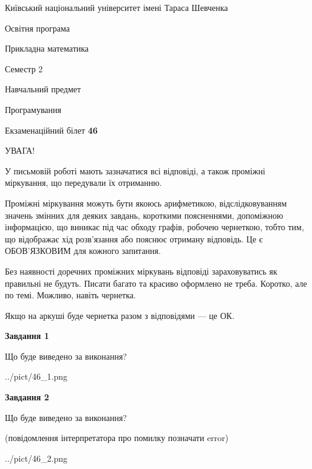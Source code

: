 \documentclass[12pt, ukrainian]{article}
\begin{document}
{{\begin {small}\par
{ \center  Київський національний університет імені Тараса Шевченка \par}
{\parbox {5 cm}{Освітня програма \hfill}{\parbox {7 cm}{Прикладна математика\hfill}}\parbox {6 cm}{\hfill Семестр 2}}\par
{\parbox {5 cm} {Навчальний предмет \hfill}\parbox {7 cm}{Програмування \hfill}\parbox {6cm}{\hfill}\par}\vspace{-7pt} \end{small}}{\center Екзаменаційний білет \No \textbf
{ 46 }\par}}
{
\begin {large}
УВАГА!

У письмовій роботі мають зазначатися всі відповіді, а також проміжні міркування, що передували їх отриманню.

Проміжні міркування можуть бути якоюсь арифметикою, відслідковуванням зна\-чень змінних для деяких завдань,
короткими поясненнями, допоміжною інформацією, що виникає під час обходу графів, робочею чернеткою,
тобто тим, що відображає хід розв’язання або пояснює отриману відповідь.
Це є ОБОВ’ЯЗКОВИМ для кожного запитання.

Без наявності доречних проміжних міркувань відповіді зараховуватись як правиль\-ні не будуть.
Писати багато та красиво оформлено не треба. Коротко, але по темі. Можли\-во, навіть чернетка.

Якщо на аркуші буде чернетка разом з відповідями --- це ОК.

\newpage

{\begin {center}\textbf{Завдання 1}\end {center}}\par
Що буде виведено за виконання?\par
\begin{center}
	{../pict/46_1.png}
\end{center}
\newpage

{\begin {center}\textbf{Завдання 2}\end {center}}\par
Що буде виведено за виконання?\par
 (повідомлення інтерпретатора про помилку позначати error)\par
\begin{center}
	{../pict/46_2.png}
\end{center}
\newpage


\end{large}}
\end{document}
